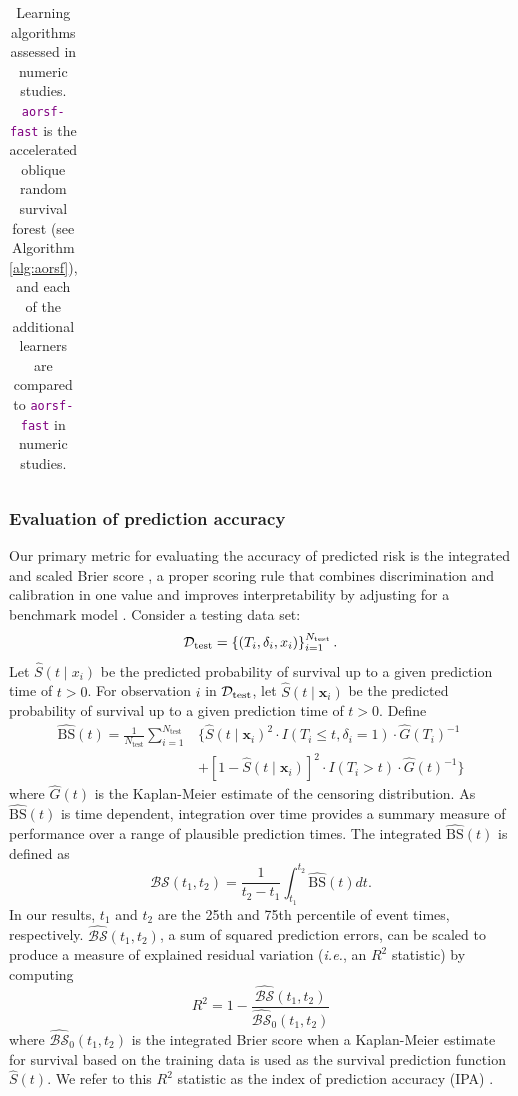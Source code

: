 \documentclass{article}\usepackage[]{graphicx}\usepackage[]{xcolor}
\newcommand{\dataset}{{\cal D}}
\newcommand{\ie}{\textit{i.e.}}
\newcommand{\bstat}{\widehat{\text{BS}}(t)}
\newcommand{\bsbar}{\mathcal{\widehat{BS}}(t_1, t_2)}
\newcommand{\bskap}{\mathcal{\widehat{BS}}_0(t_1, t_2)}
\newcommand{\ntest}{N_{\text{test}}}
\begin{document}
\begin{landscape}
\begin{table}[h!]
\begin{tabular}{p{2cm} | p{3cm} p{4cm} p{12cm}}
\end{tabular}
\caption{Learning algorithms assessed in numeric studies. \textcolor{purple}{\texttt{aorsf-fast}} is the accelerated oblique random survival forest (see Algorithm \ref{alg:aorsf}), and each of the additional learners are compared to \textcolor{purple}{\texttt{aorsf-fast}} in numeric studies.}
\label{tab:learners}
\end{table}

\end{landscape}
\restoregeometry



\subsubsection{Evaluation of prediction accuracy} \label{sec:prediction_accuracy}

Our primary metric for evaluating the accuracy of predicted risk is the integrated and scaled Brier score \citep{graf1999assessment}, a proper scoring rule that combines discrimination and calibration in one value and improves interpretability by adjusting for a benchmark model \citep{kattan2018index}. Consider a testing data set:
$$\dataset_{\text{test}} = \left\{ (T_i, \delta_i, x_{i}) \right\}_{i=1}^{N_{\text{test}}}.$$
Let $\widehat{S}(t \mid x_i)$ be the predicted probability of survival up to a given prediction time of $t > 0$.
 For observation $i$ in $\dataset_{\text{test}}$, let $\widehat{S}(t \mid \bm{x}_i)$ be the predicted probability of survival up to a given prediction time of $t > 0$. Define \begin{align*}
\bstat = \frac{1}{\ntest} \sum_{i=1}^{\ntest} &\{ \widehat{S}(t \mid \bm{x}_i)^2 \cdot I(T_i \leq t, \delta_i = 1) \cdot \widehat{G}(T_i)^{-1} \\ &+ [1-\widehat{S}(t \mid \bm{x}_i)]^2 \cdot I(T_i > t) \cdot \widehat{G}(t)^{-1}\}
\end{align*} where $\widehat{G}(t)$ is the Kaplan-Meier estimate of the censoring distribution. As $\bstat$ is time dependent, integration over time provides a summary measure of performance over a range of plausible prediction times. The integrated $\bstat$ is defined as \begin{equation}
\bsbar = \frac{1}{t_2 - t_1}\int_{t_1}^{t_2} \widehat{\text{BS}}(t) dt.
\end{equation} In our results, $t_1$ and $t_2$ are the 25th and 75th percentile of event times, respectively. $\bsbar$, a sum of squared prediction errors, can be scaled to produce a measure of explained residual variation (\ie, an $R^2$ statistic) by computing \begin{equation}
R^2 = 1 - \frac{\bsbar}{\bskap}
\end{equation} where $\bskap$ is the integrated Brier score when a Kaplan-Meier estimate for survival based on the training data is used as the survival prediction function $\widehat{S}(t)$. We refer to this $R^2$ statistic as the index of prediction accuracy (IPA) \citep{kattan2018index}.
\end{document}
